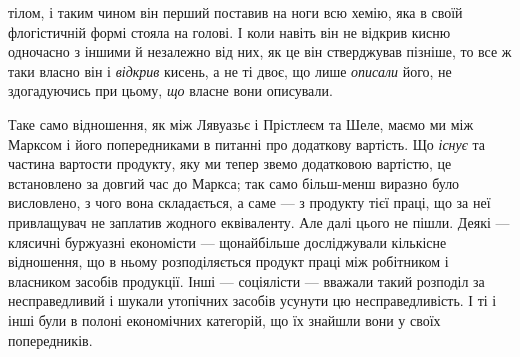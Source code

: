 \parcont{}  %
тілом, і таким чином він перший поставив на ноги всю хемію, яка в
своїй флогістичній формі стояла на голові. І коли навіть він не відкрив
кисню одночасно з іншими й незалежно від них, як це він стверджував
пізніше, то все ж таки власно він і \emph{відкрив} кисень, а не ті двоє, що
лише \emph{описали} його, не здогадуючись при цьому, \emph{що} власне вони
описували.

Таке само відношення, як між Лявуазьє і Прістлеєм та Шеле, маємо
ми між Марксом і його попередниками в питанні про додаткову вартість.
Що \emph{існує} та частина вартости продукту, яку ми тепер звемо додатковою
вартістю, це встановлено за довгий час до Маркса; так само більш-менш
виразно було висловлено, з чого вона складається, а саме —
з продукту тієї праці, що за неї привлащувач не заплатив жодного еквіваленту.
Але далі цього не пішли. Деякі — клясичні буржуазні економісти —
щонайбільше досліджували кількісне відношення, що в ньому розподіляється
продукт праці між робітником і власником засобів продукції.
Інші — соціялісти — вважали такий розподіл за несправедливий і шукали
утопічних засобів усунути цю несправедливість. І ті і інші були в полоні
економічних категорій, що їх знайшли вони у своїх попередників.

